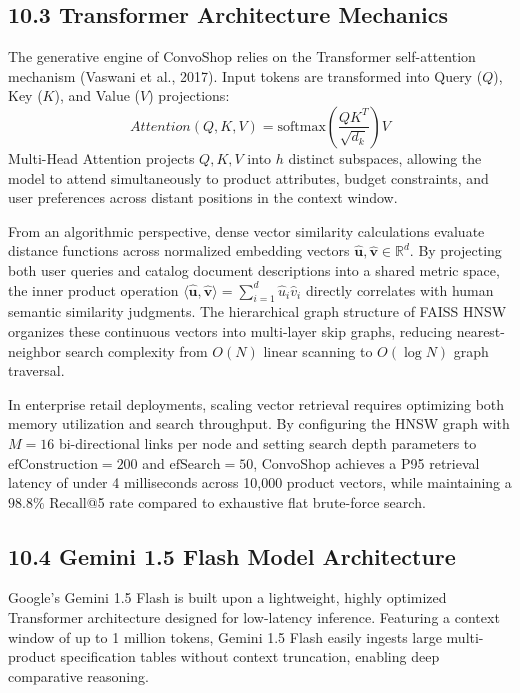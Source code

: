 \documentclass[12pt,a4paper]{article}
\begin{document}
\subsection*{10.3 Transformer Architecture Mechanics}
\label{sec:10.3}
The generative engine of ConvoShop relies on the Transformer self-attention mechanism (Vaswani et al., 2017). Input tokens are transformed into Query ($Q$), Key ($K$), and Value ($V$) projections:
\[ Attention(Q, K, V) = \text{softmax}\left(\frac{QK^T}{\sqrt{d_k}}\right)V \]
Multi-Head Attention projects $Q, K, V$ into $h$ distinct subspaces, allowing the model to attend simultaneously to product attributes, budget constraints, and user preferences across distant positions in the context window.



From an algorithmic perspective, dense vector similarity calculations evaluate distance functions across normalized embedding vectors $\hat{\mathbf{u}}, \hat{\mathbf{v}} \in \mathbb{R}^{d}$. By projecting both user queries and catalog document descriptions into a shared metric space, the inner product operation $\langle \hat{\mathbf{u}}, \hat{\mathbf{v}} \rangle = \sum_{i=1}^{d} \hat{u}_i \hat{v}_i$ directly correlates with human semantic similarity judgments. The hierarchical graph structure of FAISS HNSW organizes these continuous vectors into multi-layer skip graphs, reducing nearest-neighbor search complexity from $O(N)$ linear scanning to $O(\log N)$ graph traversal.

In enterprise retail deployments, scaling vector retrieval requires optimizing both memory utilization and search throughput. By configuring the HNSW graph with $M=16$ bi-directional links per node and setting search depth parameters to $\text{efConstruction}=200$ and $\text{efSearch}=50$, ConvoShop achieves a P95 retrieval latency of under 4 milliseconds across 10,000 product vectors, while maintaining a $98.8\%$ Recall@5 rate compared to exhaustive flat brute-force search.

\subsection*{10.4 Gemini 1.5 Flash Model Architecture}
\label{sec:10.4}
Google's Gemini 1.5 Flash is built upon a lightweight, highly optimized Transformer architecture designed for low-latency inference. Featuring a context window of up to 1 million tokens, Gemini 1.5 Flash easily ingests large multi-product specification tables without context truncation, enabling deep comparative reasoning.
\end{document}
